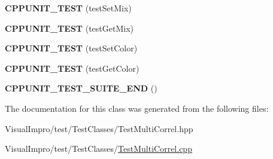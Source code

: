 \begin{DoxyCompactItemize}
\mbox{\label{class_test_multi_correl_a4a962b3f70fde1cbafcb955d0c07bbb9}} 
{\bfseries C\+P\+P\+U\+N\+I\+T\+\_\+\+T\+E\+ST} (test\+Set\+Mix)
\item 
\mbox{\label{class_test_multi_correl_a28516975a73273e0e40c8bf6a7c59fb1}} 
{\bfseries C\+P\+P\+U\+N\+I\+T\+\_\+\+T\+E\+ST} (test\+Get\+Mix)
\item 
\mbox{\label{class_test_multi_correl_acf310a4cc682683817c716d165f6c75d}} 
{\bfseries C\+P\+P\+U\+N\+I\+T\+\_\+\+T\+E\+ST} (test\+Set\+Color)
\item 
\mbox{\label{class_test_multi_correl_ac7e1fbc13d484f39717c229355582762}} 
{\bfseries C\+P\+P\+U\+N\+I\+T\+\_\+\+T\+E\+ST} (test\+Get\+Color)
\item 
\mbox{\label{class_test_multi_correl_aad2fd0870498ffe7a46198d59cf35621}} 
{\bfseries C\+P\+P\+U\+N\+I\+T\+\_\+\+T\+E\+S\+T\+\_\+\+S\+U\+I\+T\+E\+\_\+\+E\+ND} ()
\end{DoxyCompactItemize}


The documentation for this class was generated from the following files\+:\begin{DoxyCompactItemize}
\item 
Visual\+Impro/test/\+Test\+Classes/Test\+Multi\+Correl.\+hpp\item 
Visual\+Impro/test/\+Test\+Classes/\mbox{\hyperlink{_test_multi_correl_8cpp}{Test\+Multi\+Correl.\+cpp}}\end{DoxyCompactItemize}
